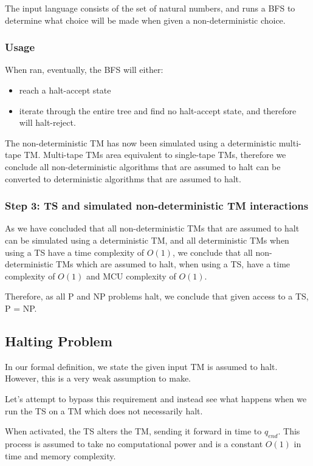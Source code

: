\documentclass{report}
\begin{document}
The input language consists of the set of natural numbers, and runs a BFS to determine what choice will be made when given a non-deterministic choice.

\subsubsection{Usage}

When ran, eventually, the BFS will either:
\begin{itemize}
  \item reach a halt-accept state
  \item iterate through the entire tree and find no halt-accept state, and therefore will halt-reject.
\end{itemize}

The non-deterministic TM has now been simulated using a deterministic multi-tape TM. Multi-tape TMs area equivalent to single-tape TMs, therefore we conclude all non-deterministic algorithms that are assumed to halt can be converted to deterministic algorithms that are assumed to halt.

\subsubsection{Step 3: TS and simulated non-deterministic TM interactions}
As we have concluded that all non-deterministic TMs that are assumed to halt can be simulated using a deterministic TM, and all deterministic TMs when using a TS have a time complexity of $O(1)$, we conclude that all non-deterministic TMs which are assumed to halt, when using a TS, have a time complexity of $O(1)$ and MCU complexity of $O(1)$.

Therefore, as all P and NP problems halt, we conclude that given access to a TS, P = NP.


\subsection{Halting Problem}

In our formal definition, we state the given input TM is assumed to halt. However, this is a very weak assumption to make.

Let's attempt to bypass this requirement and instead see what happens when we run the TS on a TM which does not necessarily halt.

When activated, the TS alters the TM, sending it forward in time to $q_{end}$. This process is assumed to take no computational power and is a constant $O(1)$ in time and memory complexity.
\end{document}
